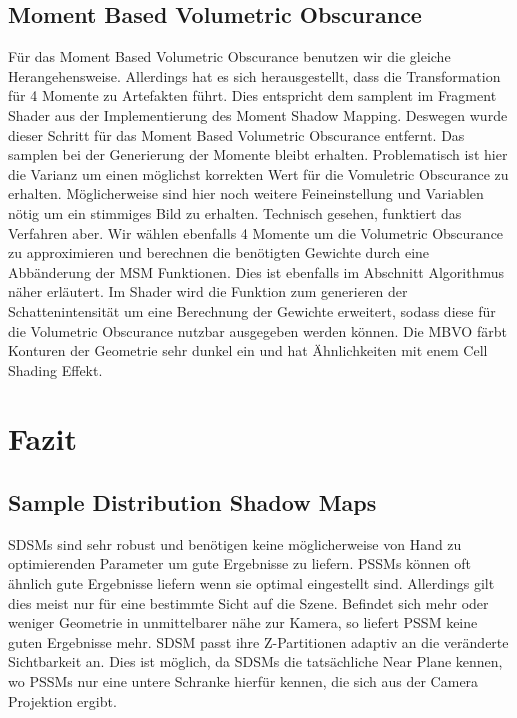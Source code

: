 \documentclass[runningheaders,a4paper]{llncs}
\begin{document}
\subsection{Moment Based Volumetric Obscurance}
Für das Moment Based Volumetric Obscurance benutzen wir die gleiche Herangehensweise. Allerdings hat es sich herausgestellt, dass die Transformation für 4 Momente zu Artefakten führt. Dies entspricht dem samplent im Fragment Shader aus der Implementierung des Moment Shadow Mapping. Deswegen wurde dieser Schritt für das Moment Based Volumetric Obscurance entfernt. Das samplen bei der Generierung der Momente bleibt erhalten. Problematisch ist hier die Varianz um einen möglichst korrekten Wert für die Vomuletric Obscurance zu erhalten. Möglicherweise sind hier noch weitere Feineinstellung und Variablen nötig um ein stimmiges Bild zu erhalten. Technisch gesehen, funktiert das Verfahren aber.
Wir wählen ebenfalls 4 Momente um die Volumetric Obscurance zu approximieren und berechnen die benötigten Gewichte durch eine Abbänderung der MSM Funktionen. Dies ist ebenfalls im Abschnitt Algorithmus näher erläutert.
Im Shader wird die Funktion zum generieren der Schattenintensität um eine Berechnung der Gewichte erweitert, sodass diese für die Volumetric Obscurance nutzbar ausgegeben werden können.
Die MBVO färbt Konturen der Geometrie sehr dunkel ein und hat Ähnlichkeiten mit enem Cell Shading Effekt.



\section{Fazit}


\subsection{Sample Distribution Shadow Maps}
SDSMs sind sehr robust und benötigen keine möglicherweise von Hand zu optimierenden Parameter um gute Ergebnisse zu liefern.
PSSMs können oft ähnlich gute Ergebnisse liefern wenn sie optimal eingestellt sind.
Allerdings gilt dies meist nur für eine bestimmte Sicht auf die Szene.
Befindet sich mehr oder weniger Geometrie in unmittelbarer nähe zur Kamera, so liefert PSSM keine guten Ergebnisse mehr.
SDSM passt ihre Z-Partitionen adaptiv an die veränderte Sichtbarkeit an.
Dies ist möglich, da SDSMs die tatsächliche Near Plane kennen, wo PSSMs nur eine untere Schranke hierfür kennen, die sich aus der Camera Projektion ergibt.
\end{document}
